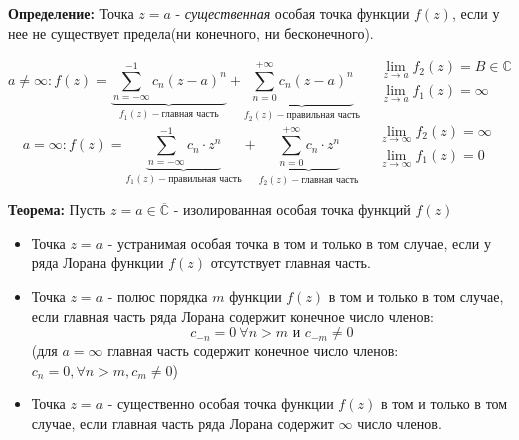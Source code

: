 \textbf{Определение:} Точка \(z=a\) - \emph{существенная} особая точка
функции \(f(z)\), если у нее не существует предела(ни конечного, ни
бесконечного).

\[
a\neq \infty: f(z)=\underbrace{\sum_{n=-\infty}^{-1}c_{n}(z-a)^{n}}_{f_{1}(z) - \text{главная часть}}+\underbrace{\sum_{n=0}^{+\infty}c_{n}(z-a)^{n}}_{f_{2}(z) - \text{правильная часть}}\quad \begin{array}{l} 
\lim_{ z \to a }f_{2}(z)=B\in \mathbb{C} \\
\lim_{ z \to a }f_{1}(z)=\infty  \end{array}
\] \[
a=\infty: f(z)=\underbrace{\sum_{n=-\infty}^{-1}c_{n}\cdot z^{n}}_{f_{1}(z) - \text{правильная часть}}+\underbrace{\sum_{n=0}^{+\infty}c_{n}\cdot z^{n}}_{f_{2}(z) - \text{главная часть}}\quad \begin{array}{l}  \lim_{ z \to \infty }f_{2}(z)=\infty \\
\lim_{ z \to \infty }f_{1}(z)=0  \end{array}
\]

\textbf{Теорема:} Пусть \(z=a\in \overline{\mathbb{C}}\) - изолированная
особая точка функций \(f(z)\)

\begin{itemize}
\tightlist
\item
  Точка \(z=a\) - устранимая особая точка в том и только в том случае,
  если у ряда Лорана функции \(f(z)\) отсутствует главная часть.
\item
  Точка \(z=a\) - полюс порядка \(m\) функции \(f(z)\) в том и только в
  том случае, если главная часть ряда Лорана содержит конечное число
  членов: \[
  c_{-n}=0 \ \forall n>m\text{ и } c_{-m}\neq 0
  \] (для \(a=\infty\) главная часть содержит конечное число членов:
  \(c_{n}=0, \forall n>m, c_{m}\neq 0\))
\item
  Точка \(z=a\) - существенно особая точка функции \(f(z)\) в том и
  только в том случае, если главная часть ряда Лорана содержит
  \(\infty\) число членов.
\end{itemize}
